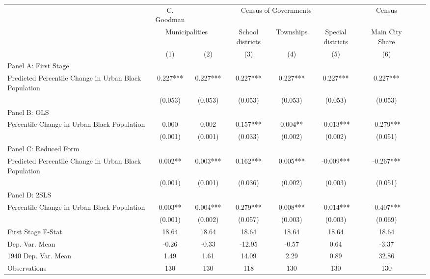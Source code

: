  \begin{tabular}{l*{8}{c}} \toprule
&\multicolumn{1}{c}{C. Goodman}&\multicolumn{4}{c}{Census of Governments}&\multicolumn{1}{c}{Census}\\\cmidrule(lr){2-2}\cmidrule(lr){3-6}\cmidrule(lr){7-7}
&\multicolumn{2}{c}{Municipalities}&\multicolumn{1}{c}{School districts}&\multicolumn{1}{c}{Townships}&\multicolumn{1}{c}{Special districts}&\multicolumn{1}{c}{Main City Share}\\\cmidrule(lr){2-3}\cmidrule(lr){4-6}\cmidrule(lr){7-7}
&\multicolumn{1}{c}{(1)}&\multicolumn{1}{c}{(2)}&\multicolumn{1}{c}{(3)}&\multicolumn{1}{c}{(4)}&\multicolumn{1}{c}{(5)}&\multicolumn{1}{c}{(6)}\\
\cmidrule(lr){1-7}
\multicolumn{6}{l}{Panel A: First Stage}\\
\cmidrule(lr){1-7}
Predicted Percentile Change in Urban Black Population&    0.227***&    0.227***&    0.227***&    0.227***&    0.227***&    0.227***\\
                &  (0.053)   &  (0.053)   &  (0.053)   &  (0.053)   &  (0.053)   &  (0.053)   \\
\cmidrule(lr){1-7}
\multicolumn{6}{l}{Panel B: OLS}\\
\cmidrule(lr){1-7}
Percentile Change in Urban Black Population&    0.000   &    0.002   &    0.157***&    0.004** &   -0.013***&   -0.279***\\
                &  (0.001)   &  (0.001)   &  (0.033)   &  (0.002)   &  (0.002)   &  (0.051)   \\
\cmidrule(lr){1-7}
\multicolumn{6}{l}{Panel C: Reduced Form}\\
\cmidrule(lr){1-7}
Predicted Percentile Change in Urban Black Population&    0.002** &    0.003***&    0.162***&    0.005***&   -0.009***&   -0.267***\\
                &  (0.001)   &  (0.001)   &  (0.036)   &  (0.002)   &  (0.003)   &  (0.051)   \\
\cmidrule(lr){1-7}
\multicolumn{6}{l}{Panel D: 2SLS}\\
\cmidrule(lr){1-7}
Percentile Change in Urban Black Population&    0.003** &    0.004***&    0.279***&    0.008***&   -0.014***&   -0.407***\\
                &  (0.001)   &  (0.002)   &  (0.057)   &  (0.003)   &  (0.003)   &  (0.069)   \\
\midrule
First Stage F-Stat&    18.64   &    18.64   &    18.64   &    18.64   &    18.64   &    18.64   \\
Dep. Var. Mean  &    -0.26   &    -0.33   &   -12.95   &    -0.57   &     0.64   &    -3.37   \\
1940 Dep. Var. Mean&     1.49   &     1.61   &    14.09   &     2.29   &     0.89   &    32.86   \\
Observations    &      130   &      130   &      118   &      130   &      130   &      130   \\
 \bottomrule \end{tabular}
